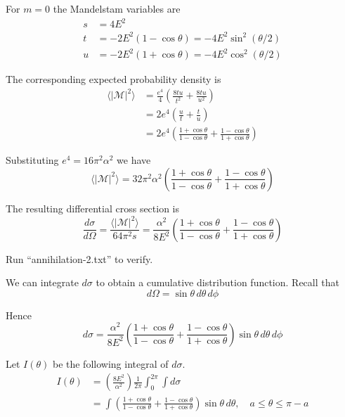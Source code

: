 \documentclass[12pt]{article}
\begin{document}
\noindent
For $m=0$ the Mandelstam variables are
\begin{align*}
s&=4E^2\\
t&=-2E^2(1-\cos\theta) = -4 E^2 \sin^2(\theta/2)\\
u&=-2E^2(1+\cos\theta) = -4 E^2 \cos^2(\theta/2)
\end{align*}

\noindent
The corresponding expected probability density is
\begin{align*}
\langle|\mathcal{M}|^2\rangle
&=
\frac{e^4}{4}
\left(
\frac{8tu}{t^2}
+
\frac{8tu}{u^2}
\right)
\\
&=2e^4\left(\frac{u}{t}+\frac{t}{u}\right)
\\
&=2e^4\left(
\frac{1+\cos\theta}{1-\cos\theta}+
\frac{1-\cos\theta}{1+\cos\theta}
\right)
\end{align*}

\noindent
Substituting $e^4=16\pi^2\alpha^2$ we have
\begin{equation*}
\langle|\mathcal{M}|^2\rangle
=32\pi^2\alpha^2\left(
\frac{1+\cos\theta}{1-\cos\theta}+
\frac{1-\cos\theta}{1+\cos\theta}
\right)
\end{equation*}

\noindent
The resulting differential cross section is
\begin{equation*}
\frac{d\sigma}{d\Omega}=\frac{\langle|\mathcal{M}|^2\rangle}{64\pi^2s}
=\frac{\alpha^2}{8E^2}\left(
\frac{1+\cos\theta}{1-\cos\theta}+
\frac{1-\cos\theta}{1+\cos\theta}
\right)
\end{equation*}

\noindent
Run ``annihilation-2.txt'' to verify.

\bigskip
\noindent
We can integrate $d\sigma$ to obtain a cumulative distribution function.
Recall that
\begin{equation*}
d\Omega=\sin\theta\,d\theta\,d\phi
\end{equation*}

\noindent
Hence
\begin{equation*}
d\sigma=
\frac{\alpha^2}{8E^2}
\left(
\frac{1+\cos\theta}{1-\cos\theta}+
\frac{1-\cos\theta}{1+\cos\theta}
\right)\sin\theta\,d\theta\,d\phi
\end{equation*}

\noindent
Let $I(\theta)$ be the following integral of $d\sigma$.
\begin{align*}
I(\theta)&=
\left(\frac{8E^2}{\alpha^2}\right)\frac{1}{2\pi}
\int_0^{2\pi}\int d\sigma
\\
&=\int
\left(
\frac{1+\cos\theta}{1-\cos\theta}+
\frac{1-\cos\theta}{1+\cos\theta}
\right)
\sin\theta\,d\theta,
\quad a\le\theta\le\pi-a
\end{align*}
\end{document}
